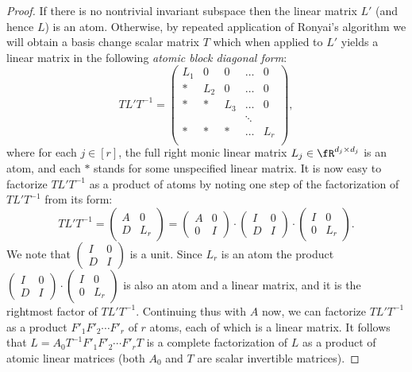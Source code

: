 \begin{proof}
If there is no nontrivial invariant
subspace then the linear matrix $L'$ (and hence $L$) is an
atom. 
Otherwise, by repeated application of Ronyai's algorithm we will
obtain a basis change scalar matrix $T$ which when applied to $L'$
yields a linear matrix in the following \emph{atomic block diagonal
  form}:
\begin{equation}\label{eq3}
TL' T^{-1} = 
\left(
\begin{array}{ccccc}
L_1 & 0 &0 &\ldots & 0\\
* & L_2 &0 &\ldots & 0\\
* & * &L_3 &\ldots & 0\\
& & &\ddots &\\
* & * &* &\ldots & L_r\\
\end{array}
\right),
\end{equation}
where for each $j\in[r]$, the full right monic linear matrix $L_j \in \fR^{d_j \times
  d_j}$ is an atom, and each $*$ stands for some unspecified linear
matrix. It is now easy to factorize $TL'T^{-1}$ as a product of atoms
by noting one step of the factorization of $TL'T^{-1}$ from its form:
\[
TL'T^{-1}=  \left(
\begin{array}{cc}
A & 0 \\
D & L_r
\end{array}
\right) =   \left(
\begin{array}{cc}
A & 0 \\
0 & I
\end{array}
\right)\cdot 
  \left(
\begin{array}{cc}
I & 0 \\
D & I
\end{array}
\right)\cdot
\left(
\begin{array}{cc}
I & 0 \\
0 & L_r
\end{array}
\right).
\]
We note that  $\left(
\begin{array}{cc}
I & 0 \\
D & I
\end{array}
\right)$ is a unit. Since $L_r$ is an atom the product $\left(
\begin{array}{cc}
I & 0 \\
D & I
\end{array}
\right)\cdot \left(
\begin{array}{cc}
I & 0 \\
0 & L_r
\end{array}
\right)$ is also an atom and a linear matrix, and it is the rightmost
factor of $TL'T^{-1}$. Continuing thus with $A$ now, we can factorize
$TL'T^{-1}$ as a product $F'_1F'_2\cdots F'_r$ of $r$ atoms, each of
which is a linear matrix. It follows that $L=A_0T^{-1}F'_1F'_2\cdots
F'_rT$ is a complete factorization of $L$ as a product of atomic
linear matrices (both $A_0$ and $T$ are scalar invertible matrices).
\end{proof}

